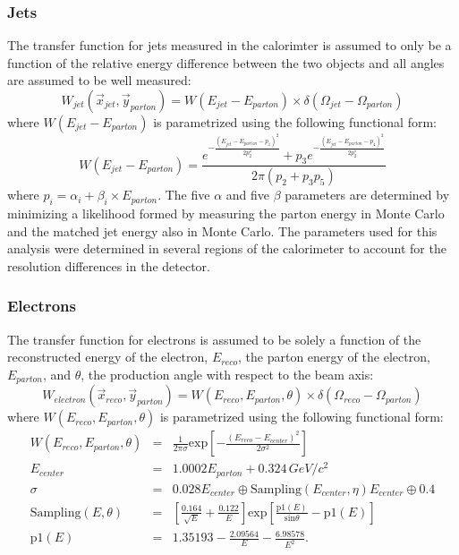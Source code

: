 \subsubsection{Jets}

The transfer function for jets measured in the calorimter is assumed
to only be a function of the relative energy difference between the
two objects and all angles are assumed to be well measured:
\begin{equation}
W_{jet}(\vec{x}_{jet}, \vec{y}_{parton}) = W(E_{jet} -
E_{parton}) \times \delta(\Omega_{jet} - \Omega_{parton})
\end{equation}
\noindent where $W(E_{jet} - E_{parton})$ is parametrized using the
following functional form:
\begin{equation}
W(E_{jet} - E_{parton}) = \frac{e^{-\frac{(E_{jet}
- E_{parton} - p_{1})^{2}}{2p^{2}_{2}}} + p_{3}e^{-\frac{(E_{jet}
- E_{parton} - p_{4})^{2}}{2p^{5}_{2}}}}{2\pi(p_{2} + p_{3}p_{5})}
\end{equation}
\noindent where $p_{i} = \alpha_{i} + \beta_{i} \times E_{parton}$.
The five $\alpha$ and five $\beta$ parameters are determined by
minimizing a likelihood formed by measuring the parton energy in Monte
Carlo and the matched jet energy also in Monte Carlo. The parameters
used for this analysis were determined in several regions of the
calorimeter to account for the resolution differences in the detector.


\subsubsection{Electrons}

The transfer function for electrons is assumed to be
solely a function of the reconstructed energy of the electron,
$E_{reco}$, the parton energy of the electron, $E_{parton}$, and
$\theta$, the production angle with respect to the beam axis:
\begin{equation}
W_{electron}(\vec{x}_{reco}, \vec{y}_{parton}) = W(E_{reco},
E_{parton}, \theta) \times \delta(\Omega_{reco} - \Omega_{parton})
\end{equation}
\noindent where $W(E_{reco}, E_{parton}, \theta)$ is parametrized
using the following functional form:
\begin{eqnarray}
W(E_{reco}, E_{parton}, \theta) & = &
\frac{1}{2\pi\sigma}\mathrm{exp}
[-\frac{(E_{reco} - E_{center})^{2}}{2\sigma^{2}}]\\
E_{center} & = &
1.0002 E_{parton} + 0.324\,{GeV}/c^2 \\
\sigma & = &
0.028 E_{center} \oplus \textrm{Sampling}(E_{center},
\eta) E_{center} \oplus 0.4 \\
\textrm{Sampling}(E, \theta) & = &
\left[\frac{0.164}{\sqrt{E}} + \frac{0.122}{E}\right]
\textrm{exp}\left[\frac{\textrm{p1}(E)}
{\textrm{sin}\theta}-\textrm{p1}(E)\right] \\
\textrm{p1}(E)& = & 1.35193 - \frac{2.09564}{E} - \frac{6.98578}{E^2}.
\end{eqnarray}


